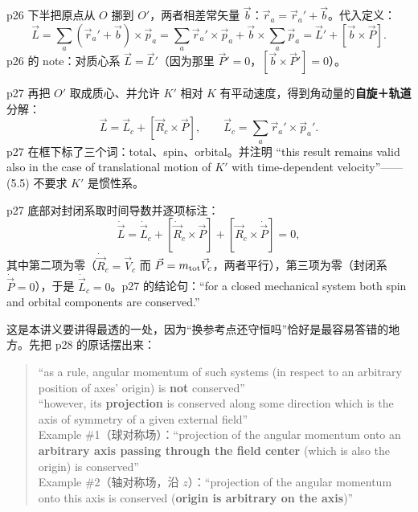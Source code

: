 \documentclass[11pt]{ctexart}
\begin{document}


p26 下半把原点从 $O$ 挪到 $O'$，两者相差常矢量 $\vec b$：$\vec r_a=\vec r_a'+\vec b$。代入定义：
\[
\vec L=\sum_a(\vec r_a'+\vec b)\times\vec p_a=\sum_a\vec r_a'\times\vec p_a+\vec b\times\sum_a\vec p_a
=\vec L'+[\vec b\times\vec P] . \tag{5.4}
\]
p26 的 note：对质心系 $\vec L=\vec L'$（因为那里 $\vec P'=0$，$[\vec b\times\vec P']=0$）。

p27 再把 $O'$ 取成质心、并允许 $K'$ 相对 $K$ 有平动速度，得到角动量的\textbf{自旋＋轨道}分解：
\[
\vec L=\vec L_c+[\vec R_c\times\vec P],\qquad
\vec L_c=\sum_a\vec r_a'\times\vec p_a' . \tag{5.5}
\]
p27 在框下标了三个词：total、spin、orbital。并注明 “this result remains valid also in the case of translational motion of $K'$ with time-dependent velocity”——(5.5) 不要求 $K'$ 是惯性系。

p27 底部对封闭系取时间导数并逐项标注：
\[
\dot{\vec L}=\dot{\vec L}_c+[\dot{\vec R}_c\times\vec P]+[\vec R_c\times\dot{\vec P}]=0,
\]
其中第二项为零（$\dot{\vec R}_c=\vec V_c$ 而 $\vec P=m_{\rm tot}\vec V_c$，两者平行），第三项为零（封闭系 $\dot{\vec P}=0$），于是 $\dot{\vec L}_c=0$。p27 的结论句：“for a closed mechanical system both spin and orbital components are conserved.”


这是本讲义要讲得最透的一处，因为“换参考点还守恒吗”恰好是最容易答错的地方。先把 p28 的原话摆出来：

\begin{quote}
“as a rule, angular momentum of such systems (in respect to an arbitrary position of axes' origin) is \textbf{not} conserved”\\
“however, its \textbf{projection} is conserved along some direction which is the axis of symmetry of a given external field”\\
Example \#1（球对称场）：“projection of the angular momentum onto an \textbf{arbitrary axis passing through the field center} (which is also the origin) is conserved”\\
Example \#2（轴对称场，沿 $z$）：“projection of the angular momentum onto this axis is conserved (\textbf{origin is arbitrary on the axis})”
\end{quote}
\end{document}
